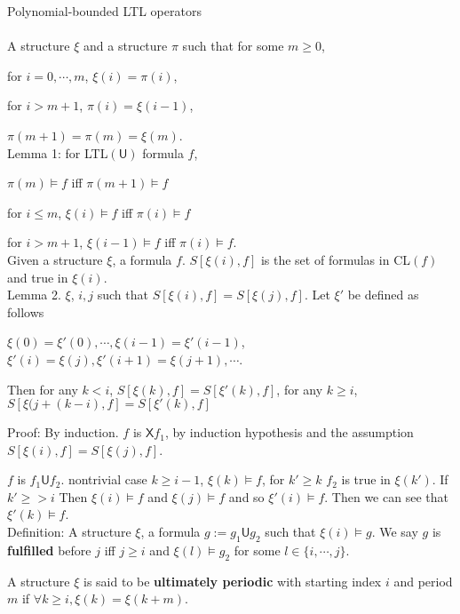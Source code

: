 \documentclass[12pt]{article}
\begin{document}
\begin{CJK*}{GBK}{song}

Polynomial-bounded LTL operators\\ \  \\

A structure $\xi$ and a structure $\pi$ such that for some $m\geq 0$,

for $i=0,\cdots,m$, $\xi(i)=\pi(i)$,

for $i>m+1$, $\pi(i)=\xi(i-1)$,

$\pi(m+1)=\pi(m)=\xi(m)$.\\

Lemma 1: for LTL$(\textsf{U})$ formula $f$,

$\pi(m)\models f$ iff $\pi(m+1)\models f$

for $i\leq m$, $\xi(i)\models f$ iff $\pi(i)\models f$

for $i>m+1$, $\xi(i-1)\models f$ iff $\pi(i)\models f$. \\


Given a structure $\xi$, a formula $f$. $S[\xi(i),f]$ is the set of formulas in CL$(f)$ and true in $\xi(i)$.\\

Lemma 2. $\xi$, $i,j$ such that $S[\xi(i),f]=S[\xi(j),f]$. Let $\xi'$ be defined as follows

$\xi(0)=\xi'(0), \cdots, \xi(i-1)=\xi'(i-1)$, $\xi'(i)=\xi(j), \xi'(i+1)=\xi(j+1), \cdots$.

Then for any $k<i$, $S[\xi(k),f]=S[\xi'(k),f]$, for any $k\geq i$, $S[\xi(j+(k-i),f]=S[\xi'(k),f]$

Proof: By induction. $f$ is $\textsf{X} f_1$, by induction hypothesis and the assumption $S[\xi(i),f]=S[\xi(j),f]$.


$f$ is $f_1\textsf{U} f_2$. nontrivial case $k\geq i-1$, $\xi(k)\models f$, for $k'\geq k$ $f_2$ is true in $\xi(k')$. If $k'\geq >i$ Then $\xi(i)\models f$ and $\xi(j)\models f$ and so $\xi'(i)\models f$. Then we can see that $\xi'(k)\models f$.\\


Definition: A structure $\xi$, a formula $g:=g_1\textsf{U} g_2$ such that $\xi(i)\models g$. We say $g$ is {\bf fulfilled} before $j$ iff $j\geq i$ and $\xi(l)\models g_2$ for some $l\in\{i,\cdots,j\}$.

A structure $\xi$ is said to be {\bf ultimately periodic} with starting index $i$ and period $m$ if $\forall k\geq i, \xi(k)=\xi(k+m)$.\\


\end{CJK*}
\end{document}
